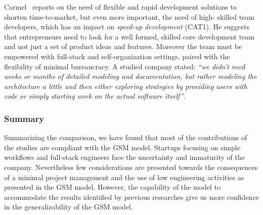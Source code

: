 \documentclass[10pt,journal,letterpaper,compsoc]{IEEEtran}
\begin{document}
Carmel~\cite{Camel1994a} reports on the need of flexible and rapid development
solutions to shorten time-to-market, but even more important, the need of high-
skilled team developers, which has an impact on \textit{speed-up development}
(CAT1). He suggests that entrepreneurs need to look for a well formed, skilled
core development team and not just a set of product ideas and features.
Moreover the team must be empowered with full-stack and self-organization
settings, paired with the flexibility of minimal bureaucracy. A studied company
stated: \textit{``we didn't need weeks or months of detailed modeling and
documentation, but rather modeling the architecture a little and then either
exploring strategies by providing users with code or simply starting work on
the actual software itself''}.



\subsubsection{Summary} Summarizing the comparison, we have found that most of
the contributions of the studies are compliant with the GSM model. Startups
focusing on simple workflows and full-stack engineers face the uncertainty and
immaturity of the company. Nevertheless few considerations are presented towards
the consequences of a minimal project management and the use of low engineering
activities as presented in the GSM model. However, the capability of the model
to accommodate the results identified by previous researches give us more
confidence in the generalizability of the GSM model.
\end{document}
